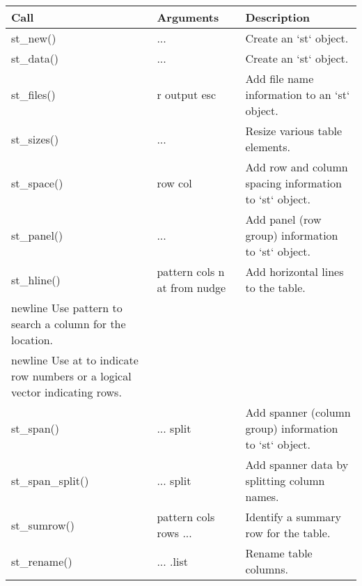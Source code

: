 \setlength{\tabcolsep}{5pt} 
\begin{threeparttable}
\renewcommand{\arraystretch}{1.3}
\begin{tabular}[h]{>{\raggedright\arraybackslash}p{3cm}>{\raggedright\arraybackslash}p{2.5cm}>{\raggedright\arraybackslash}p{7cm}}
\hline
\textbf{Call} & \textbf{Arguments} & \textbf{Description} \\
\hline
st\_new() & ... & Create an `st` object. \\ \hline
st\_data() & ... & Create an `st` object. \\ \hline
st\_files() & r  \newline output  \newline esc & Add file name information to an `st` object. \\ \hline
st\_sizes() & ... & Resize various table elements.  \\ \hline
st\_space() & row  \newline col & Add row and column spacing information to `st` object. \\ \hline
st\_panel() & ... & Add panel (row group) information to `st` object. \\ \hline
st\_hline() & pattern  \newline cols  \newline n  \newline at  \newline from  \newline nudge & Add horizontal lines to the table. \\newline
Use pattern to search a column for the location.\\newline
Use at to indicate row numbers or a logical vector indicating rows. 
 \\ \hline
st\_span() & ...  \newline split & Add spanner (column group) information to `st` object. \\ \hline
st\_span\_split() & ...  \newline split & Add spanner data by splitting column names. \\ \hline
st\_sumrow() & pattern  \newline cols  \newline rows  \newline ... & Identify a summary row for the table. \\ \hline
st\_rename() & ...  \newline .list & Rename table columns. \\ \hline

\end{tabular}
\end{threeparttable}
